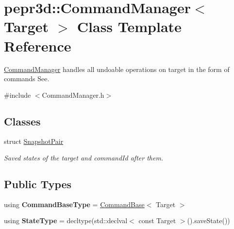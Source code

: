 \hypertarget{classpepr3d_1_1_command_manager}{}\section{pepr3d\+::Command\+Manager$<$ Target $>$ Class Template Reference}
\label{classpepr3d_1_1_command_manager}


\mbox{\hyperlink{classpepr3d_1_1_command_manager}{Command\+Manager}} handles all undoable operations on target in the form of commands See.  




{\ttfamily \#include $<$Command\+Manager.\+h$>$}

\subsection*{Classes}
\begin{DoxyCompactItemize}
\item 
struct \mbox{\hyperlink{structpepr3d_1_1_command_manager_1_1_snapshot_pair}{Snapshot\+Pair}}
\begin{DoxyCompactList}\small\item\em Saved states of the target and command\+Id after them. \end{DoxyCompactList}\end{DoxyCompactItemize}
\subsection*{Public Types}
\begin{DoxyCompactItemize}
\item 
\mbox{\label{classpepr3d_1_1_command_manager_ae3090192cabdd49b5bc0b8f983a6681a}} 
using {\bfseries Command\+Base\+Type} = \mbox{\hyperlink{classpepr3d_1_1_command_base}{Command\+Base}}$<$ Target $>$
\item 
\mbox{\label{classpepr3d_1_1_command_manager_aff7ffff59dcc764edce1bb4cbbe18704}} 
using {\bfseries State\+Type} = decltype(std\+::declval$<$ const Target $>$().save\+State())
\end{DoxyCompactItemize}
